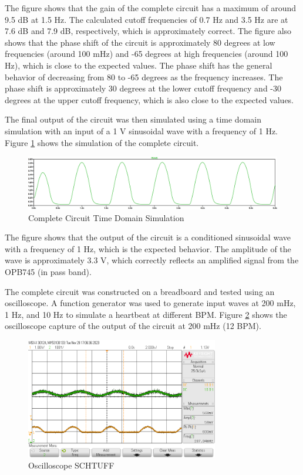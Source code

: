 \documentclass[CMPE]{KGCOEReport}
\begin{document}
The figure shows that the gain of the complete circuit has a maximum of around 9.5 dB at 1.5 Hz. The calculated cutoff frequencies of 0.7 Hz and 3.5 Hz are at 7.6 dB and 7.9 dB, respectively, which is approximately correct. The figure also shows that the phase shift of the circuit is approximately 80 degrees at low frequencies (around 100 mHz) and -65 degrees at high frequencies (around 100 Hz), which is close to the expected values. The phase shift has the general behavior of decreasing from 80 to -65 degrees as the frequency increases. The phase shift is approximately 30 degrees at the lower cutoff frequency and -30 degrees at the upper cutoff frequency, which is also close to the expected values.

The final output of the circuit was then simulated using a time domain simulation with an input of a 1 V sinusoidal wave with a frequency of 1 Hz. Figure \ref{fig:timeSim} shows the simulation of the complete circuit.

\begin{figure}[H]
    \centering
    \includegraphics[width=1\textwidth]{SimTimeOutput.png}
    \caption{Complete Circuit Time Domain Simulation}
    \label{fig:timeSim}
\end{figure}

The figure shows that the output of the circuit is a conditioned sinusoidal wave with a frequency of 1 Hz, which is the expected behavior. The amplitude of the wave is approximately 3.3 V, which correctly reflects an amplified signal from the OPB745 (in pass band).

The complete circuit was constructed on a breadboard and tested using an oscilloscope. A function generator was used to generate input waves at 200 mHz, 1 Hz, and 10 Hz to simulate a heartbeat at different BPM. Figure \ref{fig:200mHzCapture} shows the oscilloscope capture of the output of the circuit at 200 mHz (12 BPM).

\begin{figure}[H]
    \centering
    \includegraphics[width=0.75\textwidth]{200mHz.png}
    \caption{Oscilloscope SCHTUFF}
    \label{fig:200mHzCapture}
\end{figure}
\end{document}
